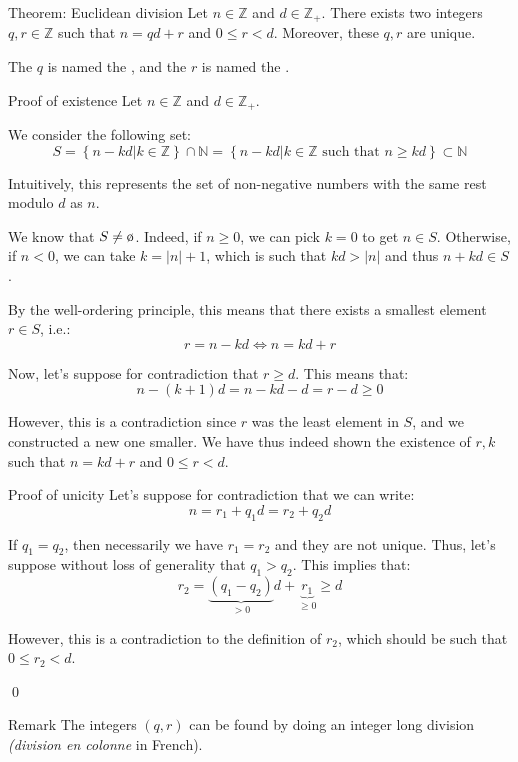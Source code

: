 \documentclass[a4paper]{article}
\begin{document}
\begin{parag}{Theorem: Euclidean division}
    Let $n \in \mathbb{Z}$ and $d \in \mathbb{Z}_+$. There exists two integers $q, r \in \mathbb{Z}$ such that $n = qd + r$ and $0 \leq r < d$. Moreover, these $q, r$ are unique.

    The $q$ is named the , and the $r$ is named the .

    \begin{subparag}{Proof of existence}
        Let $n \in \mathbb{Z}$ and $d \in \mathbb{Z}_+$.

        We consider the following set: 
        \[S = \left\{n - k d | k \in \mathbb{Z}\right\} \cap\mathbb{N} = \left\{n - kd | k \in \mathbb{Z} \text{ such that } n \geq kd\right\} \subset \mathbb{N}\]
        
        Intuitively, this represents the set of non-negative numbers with the same rest modulo $d$ as $n$.

        We know that $S \neq \o$. Indeed, if $n \geq 0$, we can pick $k = 0$ to get $n \in S$. Otherwise, if $n < 0$, we can take $k = \left|n\right| + 1$, which is such that $kd > \left|n\right|$ and thus $n + kd \in S$.

        By the well-ordering principle, this means that there exists a smallest element $r \in S$, i.e.: 
        \[r = n - kd \iff n = kd + r\]
        
        Now, let's suppose for contradiction that $r \geq d$. This means that: 
        \[n - \left(k+1\right)d = n - kd - d = r - d \geq 0\]
        
        However, this is a contradiction since $r$ was the least element in $S$, and we constructed a new one smaller. We have thus indeed shown the existence of $r, k$ such that $n = kd + r$ and $0 \leq r < d$.
    \end{subparag}

    \begin{subparag}{Proof of unicity}
        Let's suppose for contradiction that we can write: 
        \[n = r_1 + q_1 d = r_2 + q_2 d\]
        
        If $q_1 = q_2$, then necessarily we have $r_1 = r_2$ and they are not unique. Thus, let's suppose without loss of generality that $q_1 > q_2$. This implies that: 
        \[r_2 = \underbrace{\left(q_1 - q_2\right)}_{> 0}d + \underbrace{r_1}_{\geq 0} \geq d\]
        
        However, this is a contradiction to the definition of $r_2$, which should be such that $0 \leq r_2 < d$.

        \qed
    \end{subparag}

    \begin{subparag}{Remark}
        The integers $\left(q, r\right)$ can be found by doing an integer long division \textit{(division en colonne} in French).
    \end{subparag}
\end{parag}
\end{document}
